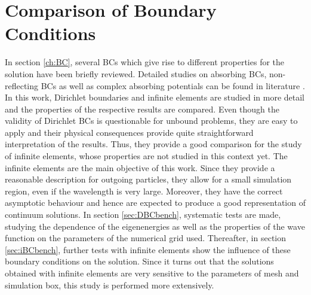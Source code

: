 \section{Comparison of Boundary Conditions}
\label{ch:BCbench}
In section \ref{ch:BC}, several BCs which give rise to different properties for the solution have been briefly reviewed.
Detailed studies on absorbing BCs, non-reflecting BCs as well as complex absorbing potentials can be found in literature \cite{babuska,artBC,capComp,absRev,nrBCrev}.
In this work, Dirichlet boundaries and infinite elements are studied in more detail and the properties of the respective results are compared.
Even though the validity of Dirichlet BCs is questionable for unbound problems, they are easy to apply and their physical consequences provide quite straightforward interpretation of the results.
Thus, they provide a good comparison for the study of infinite elements, whose properties are not studied in this context yet.
The infinite elements are the main objective of this work.
Since they provide a reasonable description for outgoing particles, they allow for a small simulation region, even if the wavelength is very large.
Moreover, they have the correct asymptotic behaviour and hence are expected to produce a good representation of continuum solutions.
In section \ref{sec:DBCbench}, systematic tests are made, studying the dependence of the eigenenergies as well as the properties of the wave function on the parameters of the numerical grid used.
Thereafter, in section \ref{sec:iBCbench}, further tests with infinite elements show the influence of these boundary conditions on the solution.
Since it turns out that the solutions obtained with infinite elements are very sensitive to the parameters of mesh and simulation box, this study is performed more extensively.


